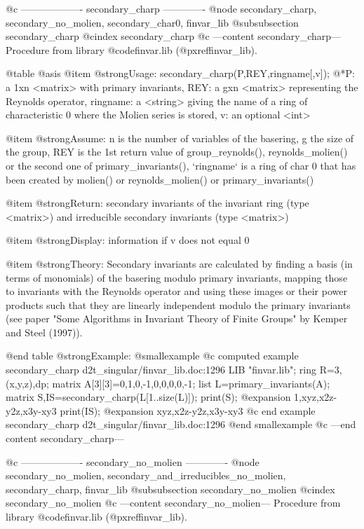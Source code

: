 @c ------------------- secondary_charp -------------
@node secondary_charp, secondary_no_molien, secondary_char0, finvar_lib
@subsubsection secondary_charp
@cindex secondary_charp
@c ---content secondary_charp---
Procedure from library @code{finvar.lib} (@pxref{finvar_lib}).

@table @asis
@item @strong{Usage:}
secondary_charp(P,REY,ringname[,v]);
@*P: a 1xn <matrix> with primary invariants, REY: a gxn <matrix>
representing the Reynolds operator, ringname: a <string> giving the
name of a ring of characteristic 0 where the Molien series is stored,
v: an optional <int>

@item @strong{Assume:}
n is the number of variables of the basering, g the size of the group,
REY is the 1st return value of group_reynolds(), reynolds_molien() or
the second one of primary_invariants(), `ringname` is a ring of
char 0 that has been created by molien() or reynolds_molien() or
primary_invariants()

@item @strong{Return:}
secondary invariants of the invariant ring (type <matrix>) and
irreducible secondary invariants (type <matrix>)

@item @strong{Display:}
information if v does not equal 0

@item @strong{Theory:}
Secondary invariants are calculated by finding a basis (in terms of
monomials) of the basering modulo primary invariants, mapping those
to invariants with the Reynolds operator and using these images or
their power products such that they are linearly independent modulo
the primary invariants (see paper "Some Algorithms in Invariant
Theory of Finite Groups" by Kemper and Steel (1997)).

@end table
@strong{Example:}
@smallexample
@c computed example secondary_charp d2t_singular/finvar_lib.doc:1296 
LIB "finvar.lib";
ring R=3,(x,y,z),dp;
matrix A[3][3]=0,1,0,-1,0,0,0,0,-1;
list L=primary_invariants(A);
matrix S,IS=secondary_charp(L[1..size(L)]);
print(S);
@expansion{} 1,xyz,x2z-y2z,x3y-xy3
print(IS);
@expansion{} xyz,x2z-y2z,x3y-xy3
@c end example secondary_charp d2t_singular/finvar_lib.doc:1296
@end smallexample
@c ---end content secondary_charp---

@c ------------------- secondary_no_molien -------------
@node secondary_no_molien, secondary_and_irreducibles_no_molien, secondary_charp, finvar_lib
@subsubsection secondary_no_molien
@cindex secondary_no_molien
@c ---content secondary_no_molien---
Procedure from library @code{finvar.lib} (@pxref{finvar_lib}).

